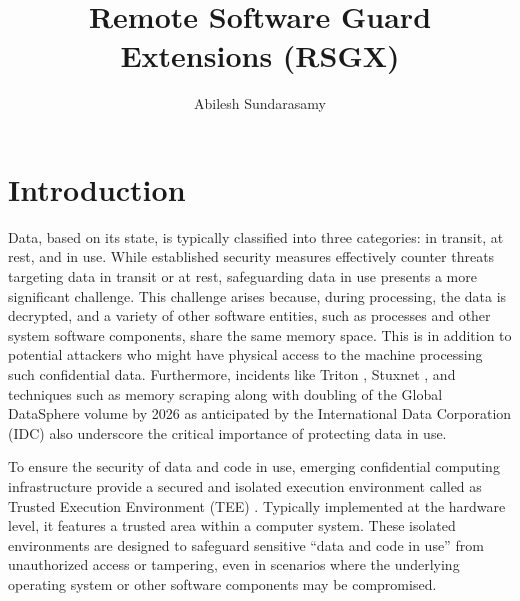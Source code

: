 \documentclass[article, doublespace,nopageskip]{VTthesis} %
\title{Remote Software Guard Extensions (RSGX)}
\author{Abilesh Sundarasamy}
\begin{document}
  \frontmatter
  \maketitle
  \tableofcontents

	\listoffigures
	\listoftables
    

	\mainmatter

	\chapter{Introduction} \label{ch:introduction}
     Data, based on its state, is typically classified into three categories: in transit, at rest, and in use. While established security measures effectively counter threats targeting data in transit or at rest, safeguarding data in use presents a more significant challenge. This challenge arises because, during processing, the data is decrypted, and a variety of other software entities, such as processes and other system software components, share the same memory space. This is in addition to potential attackers who might have physical access to the machine processing such confidential data. Furthermore, incidents like Triton \cite{Triton}, Stuxnet \cite{Stuxnet}, and techniques such as memory scraping \cite{memory-scrapping} along with doubling of the Global DataSphere volume by 2026 \cite{IDC} as anticipated by the International Data Corporation (IDC) also underscore the critical importance of protecting data in use.

    To ensure the security of data and code in use, emerging confidential computing infrastructure provide a secured and isolated execution environment called as Trusted Execution Environment (TEE) \cite{tee}. Typically implemented at the hardware level, it features a trusted area within a computer system. These isolated environments are designed to safeguard sensitive ``data and code in use'' from unauthorized access or tampering, even in scenarios where the underlying operating system or other software components may be compromised. 
\end{document}
